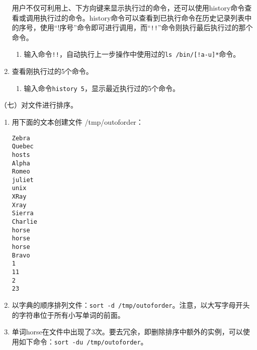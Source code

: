 \begin{enumerate}
    用户不仅可利用上、下方向键来显示执行过的命令，还可以使用history命令查看或调用执行过的命令。history命令可以查看到已执行命令在历史记录列表中的序号，使用“!序号”命令即可进行调用，而“\verb|!!|”命令则执行最后执行过的那个命令。
    \begin{enumerate}
      \item 输入命令\verb|!!|，自动执行上一步操作中使用过的\verb|ls /bin/[!a-u]*|命令。
    \end{enumerate}
  \item 查看刚执行过的5个命令。
    \begin{enumerate}
      \item 输入命令\verb|history 5|，显示最近执行过的5个命令。
    \end{enumerate}
\end{enumerate}

\vspace{0.1in}
（七）对文件进行排序。
\begin{enumerate}
  \item 用下面的文本创建文件 /tmp/outoforder：
\begin{verbatim}
Zebra
Quebec
hosts
Alpha
Romeo
juliet
unix
XRay
Xray
Sierra
Charlie
horse
horse
horse
Bravo
1
11
2
23
\end{verbatim}
  \item 以字典的顺序排列文件：\verb|sort -d /tmp/outoforder|。注意，以大写字母开头的字符串位于所有小写单词的前面。
  \item 单词horse在文件中出现了3次。要去冗余，即删除排序中额外的实例，可以使用如下命令：\verb|sort -du /tmp/outoforder|。
\end{enumerate}

